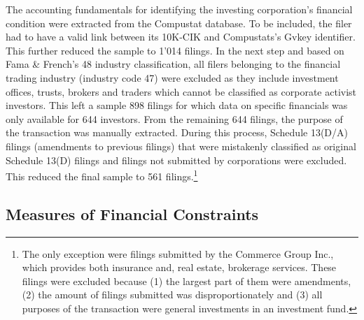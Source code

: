 \documentclass[12pt]{article}
\begin{document}
The accounting fundamentals for identifying the investing corporation's financial condition were extracted from the Compustat database. To be included, the filer had to have a valid link between its 10K-CIK and Compustats's Gvkey identifier. This further reduced the sample to 1'014 filings. In the next step and based on Fama \& French's 48 industry classification, all filers belonging to the financial trading industry (industry code 47) were excluded as they include investment offices, trusts, brokers and traders which cannot be classified as corporate activist investors. This left a sample 898 filings for which data on specific financials was only available for 644 investors. From the remaining 644 filings, the purpose of the transaction was manually extracted. During this process, Schedule 13(D/A) filings (amendments to previous filings) that were mistakenly classified as original Schedule 13(D) filings and filings not submitted by corporations were excluded. This reduced the final sample to 561 filings.\footnote{The only exception were filings submitted by the Commerce Group Inc., which provides both insurance and, real estate, brokerage services. These filings were excluded because (1) the largest part of them were amendments, (2) the amount of filings submitted was disproportionately and (3) all purposes of the transaction were general investments in an investment fund.} 

\subsection{Measures of Financial Constraints}
\end{document}
